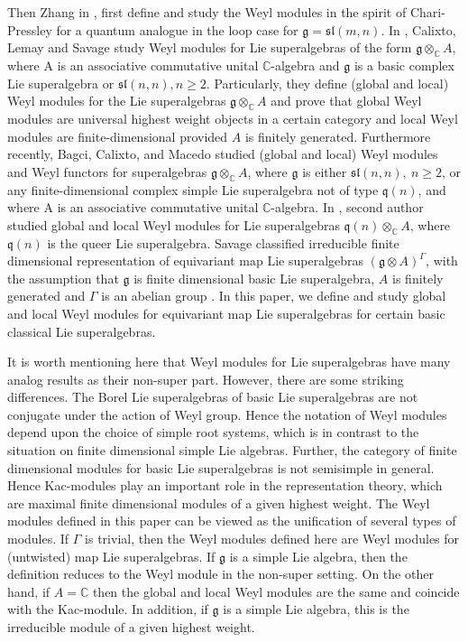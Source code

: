 \documentclass[11pt]{amsart}
\theoremstyle{plain}
\theoremstyle{definition}
\newcommand{\C}{\mathbb{C}}
\newcommand{\g}{\mathfrak{g}}
\newcommand{\q}{\mathfrak{q}}
\begin{document}
Then Zhang in \cite{Zha14}, first define and study the Weyl modules in the spirit of Chari-Pressley for a quantum analogue in the loop case for $\g = \mathfrak{sl}(m, n)$. In \cite{CLS19}, Calixto, Lemay and Savage  study Weyl modules for Lie superalgebras of the form $\g\otimes_{\C} A$, where A is an associative commutative unital $\C$-algebra and $\g$ is a basic complex Lie superalgebra or $\mathfrak{sl}(n, n), n \geq 2$. Particularly, they define (global and local) Weyl modules for the Lie superalgebras $\g\otimes_{\C} A$ and prove that global Weyl modules are universal highest weight objects in a certain category and local Weyl modules are finite-dimensional provided $A$ is finitely generated. Furthermore recently, Bagci, Calixto, and Macedo \cite{BCM19} studied (global and local) Weyl modules and Weyl functors for superalgebras $\g\otimes_{\C} A$, where $\g$ is either $\mathfrak{sl}(n, n),\ n\geq 2$, or any finite-dimensional complex simple Lie superalgebra not of type $\q(n)$, and where A is an associative commutative unital $\C$-algebra. In \cite{Nayak25}, second author studied global and local Weyl modules for Lie superalgebras $\q(n)\otimes_{\C} A$, where $\q(n)$ is the queer Lie superalgebra. Savage classified irreducible finite dimensional representation of equivariant map Lie superalgebras $(\g\otimes A)^{\Gamma}$, with the assumption that $\g$ is finite dimensional basic Lie superalgebra, $A$ is finitely generated and $\Gamma$ is an abelian group \cite{Sav14}. In this paper, we define and study global and local Weyl modules for equivariant map Lie superalgebras for certain basic classical Lie superalgebras. 

 It is worth mentioning here that Weyl modules for Lie superalgebras have many analog results as their non-super part. However, there are some striking differences. The Borel Lie superalgebras of basic Lie superalgebras are not conjugate under the action of Weyl group. Hence  the notation of Weyl modules depend upon the choice of simple root systems, which is in contrast to the situation on finite dimensional simple Lie algebras. Further, the category of finite dimensional modules for basic Lie superalgebras is not semisimple in general. Hence Kac-modules play an important role in the representation theory, which are maximal finite dimensional modules of a given highest weight. The Weyl modules defined in this paper can be viewed as the unification of several types of modules. If $\Gamma$ is trivial, then the Weyl modules defined here are Weyl modules for (untwisted) map Lie superalgebras. If $\g$ is a simple Lie algebra, then the definition reduces to the Weyl module in the non-super setting. On the other hand, if $A=\mathbb{C}$ then the global and local Weyl modules are the same and coincide with the Kac-module. In addition, if $\g$ is a simple Lie algebra, this is the irreducible module of a given highest weight.  
 
\end{document}
